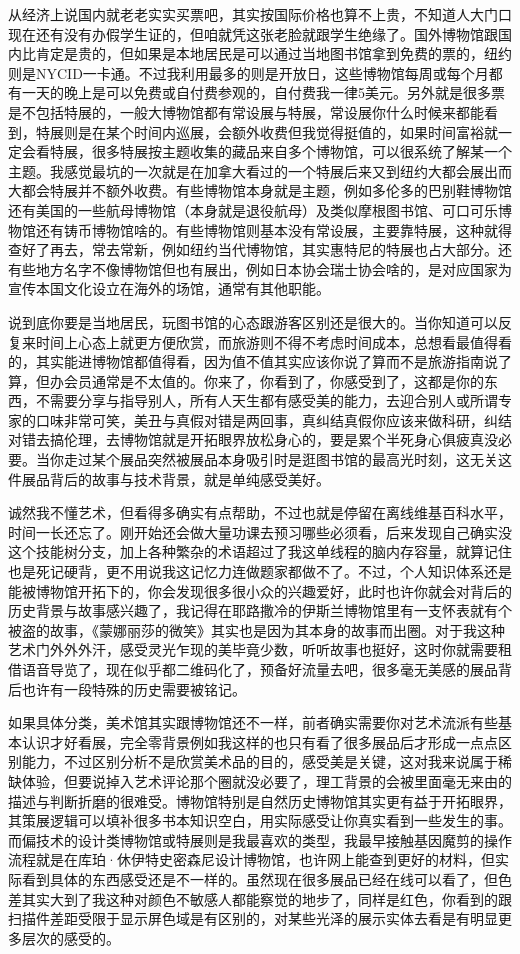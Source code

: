 \documentclass[
  letterpaper,
  DIV=11,
  numbers=noendperiod]{scrreprt}
\begin{document}
从经济上说国内就老老实实买票吧，其实按国际价格也算不上贵，不知道人大门口现在还有没有办假学生证的，但咱就凭这张老脸就跟学生绝缘了。国外博物馆跟国内比肯定是贵的，但如果是本地居民是可以通过当地图书馆拿到免费的票的，纽约则是NYCID一卡通。不过我利用最多的则是开放日，这些博物馆每周或每个月都有一天的晚上是可以免费或自付费参观的，自付费我一律5美元。另外就是很多票是不包括特展的，一般大博物馆都有常设展与特展，常设展你什么时候来都能看到，特展则是在某个时间内巡展，会额外收费但我觉得挺值的，如果时间富裕就一定会看特展，很多特展按主题收集的藏品来自多个博物馆，可以很系统了解某一个主题。我感觉最坑的一次就是在加拿大看过的一个特展后来又到纽约大都会展出而大都会特展并不额外收费。有些博物馆本身就是主题，例如多伦多的巴别鞋博物馆还有美国的一些航母博物馆（本身就是退役航母）及类似摩根图书馆、可口可乐博物馆还有铸币博物馆啥的。有些博物馆则基本没有常设展，主要靠特展，这种就得查好了再去，常去常新，例如纽约当代博物馆，其实惠特尼的特展也占大部分。还有些地方名字不像博物馆但也有展出，例如日本协会瑞士协会啥的，是对应国家为宣传本国文化设立在海外的场馆，通常有其他职能。

说到底你要是当地居民，玩图书馆的心态跟游客区别还是很大的。当你知道可以反复来时间上心态上就更方便欣赏，而旅游则不得不考虑时间成本，总想看最值得看的，其实能进博物馆都值得看，因为值不值其实应该你说了算而不是旅游指南说了算，但办会员通常是不太值的。你来了，你看到了，你感受到了，这都是你的东西，不需要分享与指导别人，所有人天生都有感受美的能力，去迎合别人或所谓专家的口味非常可笑，美丑与真假对错是两回事，真纠结真假你应该来做科研，纠结对错去搞伦理，去博物馆就是开拓眼界放松身心的，要是累个半死身心俱疲真没必要。当你走过某个展品突然被展品本身吸引时是逛图书馆的最高光时刻，这无关这件展品背后的故事与技术背景，就是单纯感受美好。

诚然我不懂艺术，但看得多确实有点帮助，不过也就是停留在离线维基百科水平，时间一长还忘了。刚开始还会做大量功课去预习哪些必须看，后来发现自己确实没这个技能树分支，加上各种繁杂的术语超过了我这单线程的脑内存容量，就算记住也是死记硬背，更不用说我这记忆力连做题家都做不了。不过，个人知识体系还是能被博物馆开拓下的，你会发现很多很小众的兴趣爱好，此时也许你就会对背后的历史背景与故事感兴趣了，我记得在耶路撒冷的伊斯兰博物馆里有一支怀表就有个被盗的故事，《蒙娜丽莎的微笑》其实也是因为其本身的故事而出圈。对于我这种艺术门外外外汗，感受灵光乍现的美毕竟少数，听听故事也挺好，这时你就需要租借语音导览了，现在似乎都二维码化了，预备好流量去吧，很多毫无美感的展品背后也许有一段特殊的历史需要被铭记。

如果具体分类，美术馆其实跟博物馆还不一样，前者确实需要你对艺术流派有些基本认识才好看展，完全零背景例如我这样的也只有看了很多展品后才形成一点点区别能力，不过区别分析不是欣赏美术品的目的，感受美是关键，这对我来说属于稀缺体验，但要说掉入艺术评论那个圈就没必要了，理工背景的会被里面毫无来由的描述与判断折磨的很难受。博物馆特别是自然历史博物馆其实更有益于开拓眼界，其策展逻辑可以填补很多书本知识空白，用实际感受让你真实看到一些发生的事。而偏技术的设计类博物馆或特展则是我最喜欢的类型，我最早接触基因魔剪的操作流程就是在库珀·休伊特史密森尼设计博物馆，也许网上能查到更好的材料，但实际看到具体的东西感受还是不一样的。虽然现在很多展品已经在线可以看了，但色差其实大到了我这种对颜色不敏感人都能察觉的地步了，同样是红色，你看到的跟扫描件差距受限于显示屏色域是有区别的，对某些光泽的展示实体去看是有明显更多层次的感受的。
\end{document}

